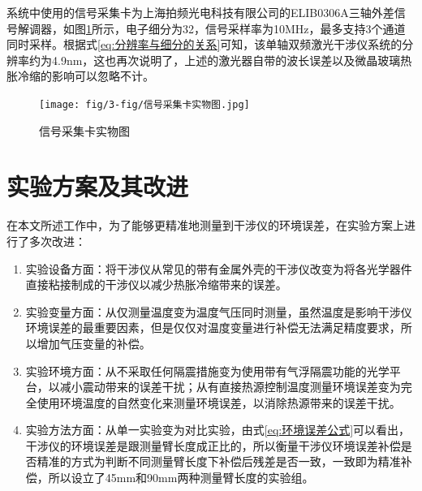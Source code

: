 系统中使用的信号采集卡为上海拍频光电科技有限公司的ELIB0306A三轴外差信号解调器，如图\ref{fig:信号采集卡实物图}所示，电子细分为32，信号采样率为10MHz，最多支持3个通道同时采样\cite{信号处理卡}。根据式\eqref{eq:分辨率与细分的关系}可知，该单轴双频激光干涉仪系统的分辨率约为4.9nm，这也再次说明了，上述的激光器自带的波长误差以及微晶玻璃热胀冷缩的影响可以忽略不计。
\begin{figure}[htb]
    \centering
    \texttt{[image: fig/3-fig/信号采集卡实物图.jpg]}
    \caption{信号采集卡实物图}
    \label{fig:信号采集卡实物图}
\end{figure}

\section{实验方案及其改进}
在本文所述工作中，为了能够更精准地测量到干涉仪的环境误差，在实验方案上进行了多次改进：
\begin{enumerate}
    \item 实验设备方面：将干涉仪从常见的带有金属外壳的干涉仪改变为将各光学器件直接粘接制成的干涉仪以减少热胀冷缩带来的误差。
    \item 实验变量方面：从仅测量温度变为温度气压同时测量，虽然温度是影响干涉仪环境误差的最重要因素，但是仅仅对温度变量进行补偿无法满足精度要求，所以增加气压变量的补偿。
    \item 实验环境方面：从不采取任何隔震措施变为使用带有气浮隔震功能的光学平台，以减小震动带来的误差干扰；从有直接热源控制温度测量环境误差变为完全使用环境温度的自然变化来测量环境误差，以消除热源带来的误差干扰。
    \item 实验方法方面：从单一实验变为对比实验，由式\eqref{eq:环境误差公式}可以看出，干涉仪的环境误差是跟测量臂长度成正比的，所以衡量干涉仪环境误差补偿是否精准的方式为判断不同测量臂长度下补偿后残差是否一致，一致即为精准补偿，所以设立了45mm和90mm两种测量臂长度的实验组。
  \end{enumerate}
